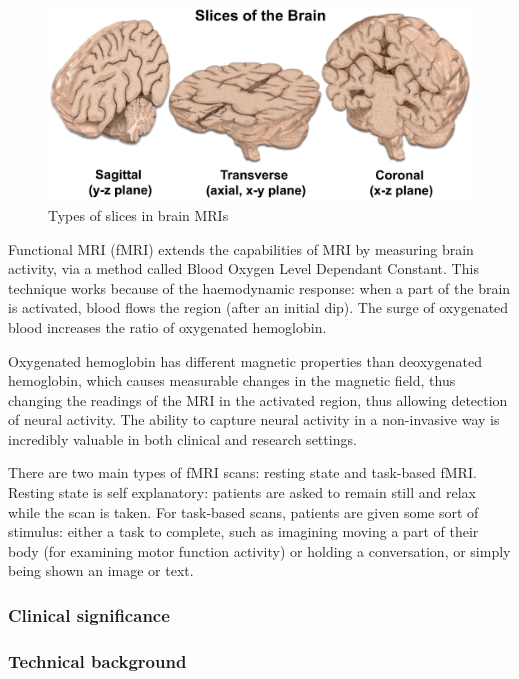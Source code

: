 	\begin{figure}[!h]
		\centering
		\includegraphics[width=\textwidth]{figures/slice_types.png}
		\caption{Types of slices in brain MRIs\cite{mripage}}
	\end{figure}
	
	Functional MRI (fMRI) extends the capabilities of MRI by measuring brain activity, via a method called Blood Oxygen Level Dependant Constant\cite{glover2011overview}. This technique works because of the haemodynamic response: when a part of the brain is activated, blood flows the region (after an initial dip). The surge of oxygenated blood increases the ratio of oxygenated hemoglobin.
	
	Oxygenated hemoglobin has different magnetic properties than deoxygenated hemoglobin, which causes measurable changes in the magnetic field, thus changing the readings of the MRI in the activated region, thus allowing detection of neural activity. The ability to capture neural activity in a non-invasive way is incredibly valuable in both clinical and research settings.
	
	There are two main types of fMRI scans: resting state and task-based fMRI. Resting state is self explanatory: patients are asked to remain still and relax while the scan is taken. For task-based scans, patients are given some sort of stimulus: either a task to complete, such as imagining moving a part of their body (for examining motor function activity) or holding a conversation, or simply being shown an image or text. 
	
		\subsubsection{Clinical significance }
		
		
		
	
		\subsubsection{Technical background}
		
